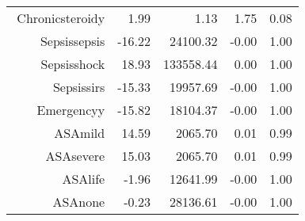 \begin{tabular}{rrrrr}
$$  Chronic\-steroid\-y & 1.99 & 1.13 & 1.75 & 0.08 \\ 
  Sepsis\-sepsis & -16.22 & 24100.32 & -0.00 & 1.00 \\ 
  Sepsis\-shock & 18.93 & 133558.44 & 0.00 & 1.00 \\ 
  Sepsis\-sirs & -15.33 & 19957.69 & -0.00 & 1.00 \\ 
  Emergency\-y & -15.82 & 18104.37 & -0.00 & 1.00 \\ 
  ASA\-mild & 14.59 & 2065.70 & 0.01 & 0.99 \\ 
  ASA\-severe & 15.03 & 2065.70 & 0.01 & 0.99 \\ 
  ASA\-life & -1.96 & 12641.99 & -0.00 & 1.00 \\ 
  ASA\-none & -0.23 & 28136.61 & -0.00 & 1.00 \\ 
   \hline
\end{tabular}

